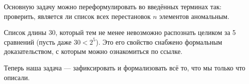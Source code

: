 \abz Основную задачу можно переформулировать во введённых терминах так: проверить, является ли список всех перестановок $n$ элементов аномальным.

\begin{exmpl}
Список длины 30, который тем не менее невозможно распознать целиком за 5 сравнений (пусть даже $30 < 2^5$). Это его свойство снабжено формальным доказательством, с которым можно ознакомиться по ссылке.

\end{exmpl}

\abz Теперь наша задача — зафиксировать и формализовать всё то, что мы только что описали.